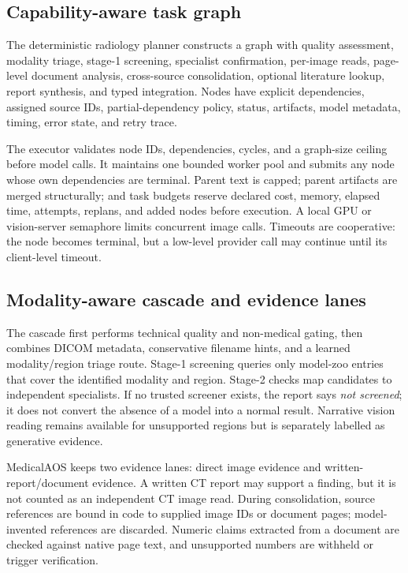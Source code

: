 \documentclass[a4paper,conference]{IEEEtran}
\begin{document}
\subsection{Capability-aware task graph}
The deterministic radiology planner constructs a graph with quality assessment, modality triage, stage-1 screening, specialist confirmation, per-image reads, page-level document analysis, cross-source consolidation, optional literature lookup, report synthesis, and typed integration. Nodes have explicit dependencies, assigned source IDs, partial-dependency policy, status, artifacts, model metadata, timing, error state, and retry trace.

The executor validates node IDs, dependencies, cycles, and a graph-size ceiling before model calls. It maintains one bounded worker pool and submits any node whose own dependencies are terminal. Parent text is capped; parent artifacts are merged structurally; and task budgets reserve declared cost, memory, elapsed time, attempts, replans, and added nodes before execution. A local GPU or vision-server semaphore limits concurrent image calls. Timeouts are cooperative: the node becomes terminal, but a low-level provider call may continue until its client-level timeout.

\subsection{Modality-aware cascade and evidence lanes}
The cascade first performs technical quality and non-medical gating, then combines DICOM metadata, conservative filename hints, and a learned modality/region triage route. Stage-1 screening queries only model-zoo entries that cover the identified modality and region. Stage-2 checks map candidates to independent specialists. If no trusted screener exists, the report says \textit{not screened}; it does not convert the absence of a model into a normal result. Narrative vision reading remains available for unsupported regions but is separately labelled as generative evidence.

MedicalAOS keeps two evidence lanes: direct image evidence and written-report/document evidence. A written CT report may support a finding, but it is not counted as an independent CT image read. During consolidation, source references are bound in code to supplied image IDs or document pages; model-invented references are discarded. Numeric claims extracted from a document are checked against native page text, and unsupported numbers are withheld or trigger verification.
\end{document}
